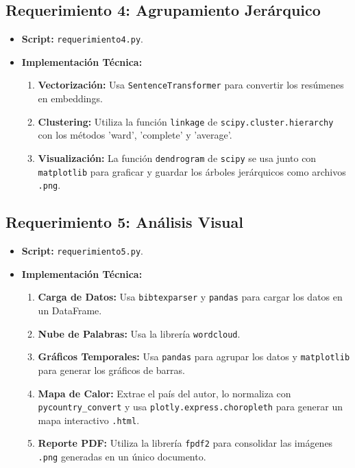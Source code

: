 \documentclass[a4paper, 11pt]{article}
\begin{document}
\subsection{Requerimiento 4: Agrupamiento Jerárquico}
\begin{itemize}
    \item \textbf{Script:} \texttt{requerimiento4.py}.
    \item \textbf{Implementación Técnica:}
    \begin{enumerate}
        \item \textbf{Vectorización:} Usa \texttt{SentenceTransformer} para convertir los resúmenes en embeddings.
        \item \textbf{Clustering:} Utiliza la función \texttt{linkage} de \texttt{scipy.cluster.hierarchy} con los métodos 'ward', 'complete' y 'average'.
        \item \textbf{Visualización:} La función \texttt{dendrogram} de \texttt{scipy} se usa junto con \texttt{matplotlib} para graficar y guardar los árboles jerárquicos como archivos \texttt{.png}.
    \end{enumerate}
\end{itemize}

\subsection{Requerimiento 5: Análisis Visual}
\begin{itemize}
    \item \textbf{Script:} \texttt{requerimiento5.py}.
    \item \textbf{Implementación Técnica:}
    \begin{enumerate}
        \item \textbf{Carga de Datos:} Usa \texttt{bibtexparser} y \texttt{pandas} para cargar los datos en un DataFrame.
        \item \textbf{Nube de Palabras:} Usa la librería \texttt{wordcloud}.
        \item \textbf{Gráficos Temporales:} Usa \texttt{pandas} para agrupar los datos y \texttt{matplotlib} para generar los gráficos de barras.
        \item \textbf{Mapa de Calor:} Extrae el país del autor, lo normaliza con \texttt{pycountry_convert} y usa \texttt{plotly.express.choropleth} para generar un mapa interactivo \texttt{.html}.
        \item \textbf{Reporte PDF:} Utiliza la librería \texttt{fpdf2} para consolidar las imágenes \texttt{.png} generadas en un único documento.
    \end{enumerate}
\end{itemize}
\end{document}
